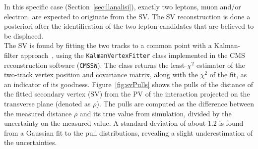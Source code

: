 In this specific case (Section~\ref{sec:llanalisi}), exactly two leptons, muon and/or electron, are
expected to originate from the SV. The SV reconstruction is done a
posteriori after the identification of the two lepton candidates that
are believed to be displaced. \\
The SV is found by fitting the two tracks to a common point with a Kalman-filter
approach~\cite{BILLOIR1990219}, using the \texttt{KalmanVertexFitter}
class implemented in the CMS reconstruction software (\texttt{CMSSW}).
The class returns the least-$\chi^2$ estimator of the two-track vertex
position and covariance matrix, along with the $\chi^2$ of the fit, as
an indicator of its goodness.
Figure~\ref{fig:svPulls} shows the pulls of the distance of the fitted
secondary vertex (SV) from the PV of the interaction projected on the
transverse plane (denoted as $\rho$). The pulls
are computed as the difference between the measured distance $\rho$
and its true value from simulation, divided by the uncertainty
on the measured value. A standard deviation of about 1.2 is found from
a Gaussian fit to the pull distributions, revealing a slight
underestimation of the uncertainties.

